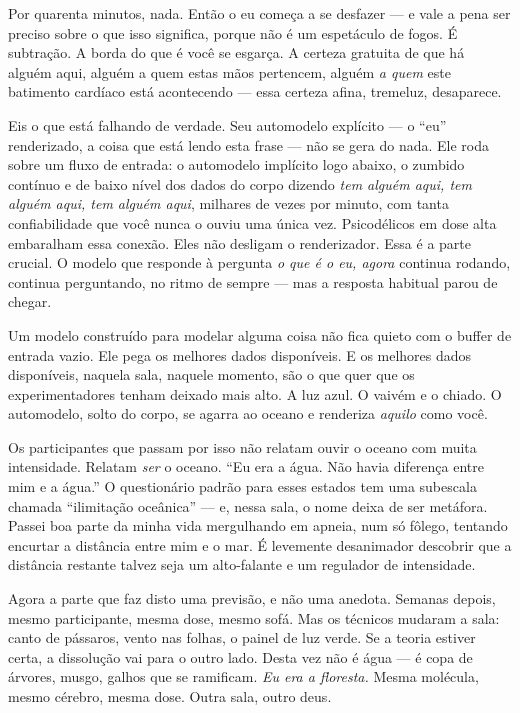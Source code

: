 \documentclass[11pt, twoside, openright]{book}
\begin{document}
Por quarenta minutos, nada. Então o eu começa a se desfazer --- e vale a pena ser preciso sobre o que isso significa, porque não é um espetáculo de fogos. É subtração. A borda do que é você se esgarça. A certeza gratuita de que há alguém aqui, alguém a quem estas mãos pertencem, alguém \textit{a quem} este batimento cardíaco está acontecendo --- essa certeza afina, tremeluz, desaparece.

Eis o que está falhando de verdade. Seu automodelo explícito --- o ``eu'' renderizado, a coisa que está lendo esta frase --- não se gera do nada. Ele roda sobre um fluxo de entrada: o automodelo implícito logo abaixo, o zumbido contínuo e de baixo nível dos dados do corpo dizendo \textit{tem alguém aqui, tem alguém aqui, tem alguém aqui}, milhares de vezes por minuto, com tanta confiabilidade que você nunca o ouviu uma única vez. Psicodélicos em dose alta embaralham essa conexão. Eles não desligam o renderizador. Essa é a parte crucial. O modelo que responde à pergunta \textit{o que é o eu, agora} continua rodando, continua perguntando, no ritmo de sempre --- mas a resposta habitual parou de chegar.

Um modelo construído para modelar alguma coisa não fica quieto com o buffer de entrada vazio. Ele pega os melhores dados disponíveis. E os melhores dados disponíveis, naquela sala, naquele momento, são o que quer que os experimentadores tenham deixado mais alto. A luz azul. O vaivém e o chiado. O automodelo, solto do corpo, se agarra ao oceano e renderiza \textit{aquilo} como você.

Os participantes que passam por isso não relatam ouvir o oceano com muita intensidade. Relatam \textit{ser} o oceano. ``Eu era a água. Não havia diferença entre mim e a água.'' O questionário padrão para esses estados tem uma subescala chamada ``ilimitação oceânica'' --- e, nessa sala, o nome deixa de ser metáfora. Passei boa parte da minha vida mergulhando em apneia, num só fôlego, tentando encurtar a distância entre mim e o mar. É levemente desanimador descobrir que a distância restante talvez seja um alto-falante e um regulador de intensidade.

Agora a parte que faz disto uma previsão, e não uma anedota. Semanas depois, mesmo participante, mesma dose, mesmo sofá. Mas os técnicos mudaram a sala: canto de pássaros, vento nas folhas, o painel de luz verde. Se a teoria estiver certa, a dissolução vai para o outro lado. Desta vez não é água --- é copa de árvores, musgo, galhos que se ramificam. \textit{Eu era a floresta.} Mesma molécula, mesmo cérebro, mesma dose. Outra sala, outro deus.
\end{document}
